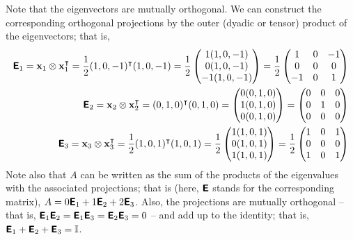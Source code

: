 {Note that the eigenvectors are mutually orthogonal.
We can construct the corresponding orthogonal projections by the outer (dyadic or tensor) product
of the eigenvectors; that is,
\begin{equation}
\begin{split}
\textsf{\textbf{E}}_1 =
{\bf x}_1 \otimes {\bf x}_1^\intercal  =
\frac{1}{2} (1,0,-1)^\intercal (1,0,-1) =
\frac{1}{2}
\begin{pmatrix}
1(1,0,-1)\\
0(1,0,-1)\\
-1(1,0,-1)
\end{pmatrix} =
\frac{1}{2}
\begin{pmatrix}
1&0&-1\\
0&0&0\\
-1&0&1
\end{pmatrix}
\\
\textsf{\textbf{E}}_{2} =
{\bf x}_{2} \otimes {\bf x}_{2}^\intercal  =
 (0,1,0)^\intercal (0,1,0) =
\begin{pmatrix}
0(0,1,0)\\
1(0,1,0)\\
0(0,1,0)
\end{pmatrix} =
\begin{pmatrix}
0&0&0\\
0&1&0\\
0&0&0
\end{pmatrix}
\\
\textsf{\textbf{E}}_{3} =
{\bf x}_{3} \otimes {\bf x}_{3}^\intercal  =
\frac{1}{2} (1,0,1)^\intercal (1,0,1) =
\frac{1}{2}
\begin{pmatrix}
1(1,0,1)\\
0(1,0,1)\\
1(1,0,1)
\end{pmatrix} =
\frac{1}{2}
\begin{pmatrix}
1&0&1\\
0&0&0\\
1&0&1
\end{pmatrix}
\end{split}
\end{equation}
Note also that $A$ can be written as the sum of the products of the
eigenvalues with the associated projections; that is (here, $\textsf{\textbf{E}}$
stands for the corresponding matrix),
$A= 0  \textsf{\textbf{E}}_1 + 1  \textsf{\textbf{E}}_{2} +2\textsf{\textbf{E}}_{3} $.
Also, the projections are mutually orthogonal
-- that is,
$\textsf{\textbf{E}}_1 \textsf{\textbf{E}}_2 = \textsf{\textbf{E}}_1\textsf{\textbf{E}}_3=\textsf{\textbf{E}}_2\textsf{\textbf{E}}_3=0$
--
and add up to the identity; that is,
$\textsf{\textbf{E}}_1+\textsf{\textbf{E}}_2+\textsf{\textbf{E}}_3={\Bbb I}$.
{\textrm{\eexample}}
}

